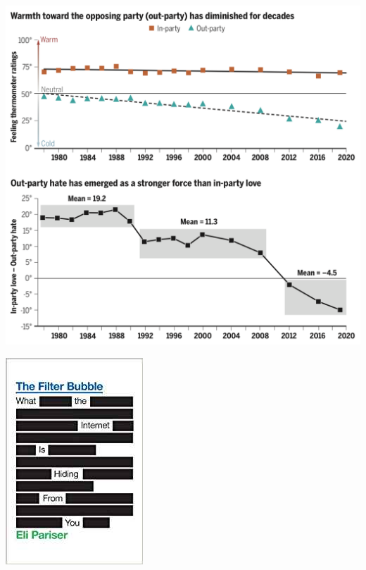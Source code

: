 \documentclass[aspectratio=169]{beamer}
\begin{document}
\begin{frame}

\begin{center}
\includegraphics[height=0.95\textheight]{figures/finkel_political_2020_fig1}
\end{center}

\end{frame}
\begin{frame}

\begin{center}
\includegraphics[height=0.95\textheight]{figures/pariser_filter_2011_cover}
\end{center}

\end{frame}
\end{document}
